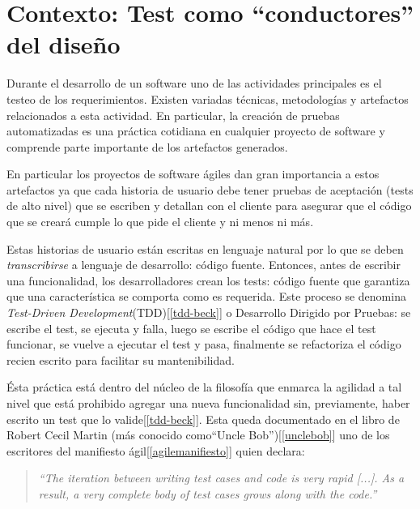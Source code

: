 \section{Contexto: Test como ``conductores'' del diseño}
\par Durante el desarrollo de un software uno de las actividades principales es el testeo de los requerimientos. Existen variadas técnicas, metodologías y artefactos relacionados a esta actividad. En particular, la creación de pruebas automatizadas es una práctica cotidiana en cualquier proyecto de software y comprende parte importante de los artefactos generados. \\

\par En particular los proyectos de software ágiles dan gran importancia a estos artefactos ya que cada historia de usuario debe tener pruebas de aceptación (tests de alto nivel) que se escriben y detallan con el cliente para asegurar que el código que se creará cumple lo que pide el cliente y ni menos ni más.

\par Estas historias de usuario están escritas en lenguaje natural por lo que se deben \emph{transcribirse} a lenguaje de desarrollo: código fuente. Entonces, antes de escribir una funcionalidad, los desarrolladores crean los tests: código fuente que garantiza que una característica se comporta como es requerida. Este proceso se denomina \emph{Test-Driven Development}(TDD)[\ref{tdd-beck}]  o Desarrollo Dirigido por Pruebas: se escribe el test, se ejecuta y falla, luego se escribe el código que hace el test funcionar, se vuelve a ejecutar el test y pasa, finalmente se refactoriza el código recien escrito para facilitar su mantenibilidad.

\par Ésta práctica está dentro del núcleo de la filosofía que enmarca la agilidad a tal nivel que está prohibido agregar una nueva funcionalidad sin, previamente, haber escrito un test que lo valide[\ref{tdd-beck}]. Esta queda documentado en el libro de Robert Cecil Martin (más conocido como``Uncle Bob'')[\ref{unclebob}] uno de los escritores del manifiesto ágil[\ref{agilemanifiesto}] quien declara:

\begin{quote}
\emph{``The iteration between writing test cases and code is very rapid [...]. As a result, a very complete body of test cases grows along with the code.''}
\end{quote}


